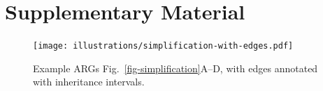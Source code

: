 \documentclass{article}
\begin{document}
\clearpage
\renewcommand\thefigure{S\arabic{figure}}
\setcounter{figure}{0}
\renewcommand\thetable{S\arabic{table}}
\setcounter{table}{0}

\section*{Supplementary Material}

\begin{figure}[ht]
	\begin{center}
		\texttt{[image: illustrations/simplification-with-edges.pdf]}
	\end{center}
	\caption{\label{fig-simplification-with-edges}
	Example ARGs Fig.~\ref{fig-simplification}A--D,
    with edges annotated with inheritance intervals.
	}
\end{figure}
\end{document}
